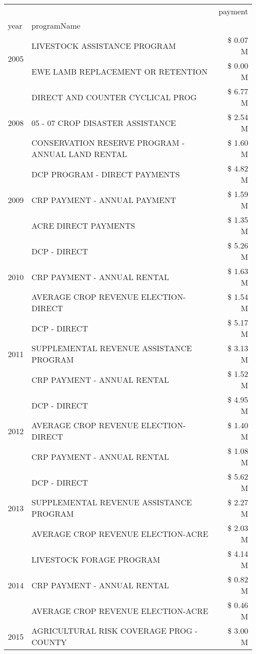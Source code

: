 \begin{tabular}{llr}
\toprule
 &  & payment \\
year & programName &  \\
\midrule
\multirow[t]{2}{*}{2005} & LIVESTOCK ASSISTANCE PROGRAM & \$ 0.07 M \\
 & EWE LAMB REPLACEMENT OR RETENTION & \$ 0.00 M \\
\cline{1-3}
\multirow[t]{3}{*}{2008} & DIRECT AND COUNTER CYCLICAL PROG & \$ 6.77 M \\
 & 05 - 07 CROP DISASTER ASSISTANCE & \$ 2.54 M \\
 & CONSERVATION RESERVE PROGRAM - ANNUAL LAND RENTAL & \$ 1.60 M \\
\cline{1-3}
\multirow[t]{3}{*}{2009} & DCP PROGRAM - DIRECT PAYMENTS & \$ 4.82 M \\
 & CRP PAYMENT - ANNUAL PAYMENT & \$ 1.59 M \\
 & ACRE DIRECT PAYMENTS & \$ 1.35 M \\
\cline{1-3}
\multirow[t]{3}{*}{2010} & DCP - DIRECT & \$ 5.26 M \\
 & CRP PAYMENT - ANNUAL RENTAL & \$ 1.63 M \\
 & AVERAGE CROP REVENUE ELECTION-DIRECT & \$ 1.54 M \\
\cline{1-3}
\multirow[t]{3}{*}{2011} & DCP - DIRECT & \$ 5.17 M \\
 & SUPPLEMENTAL REVENUE ASSISTANCE PROGRAM & \$ 3.13 M \\
 & CRP PAYMENT - ANNUAL RENTAL & \$ 1.52 M \\
\cline{1-3}
\multirow[t]{3}{*}{2012} & DCP - DIRECT & \$ 4.95 M \\
 & AVERAGE CROP REVENUE ELECTION-DIRECT & \$ 1.40 M \\
 & CRP PAYMENT - ANNUAL RENTAL & \$ 1.08 M \\
\cline{1-3}
\multirow[t]{3}{*}{2013} & DCP - DIRECT & \$ 5.62 M \\
 & SUPPLEMENTAL REVENUE ASSISTANCE PROGRAM & \$ 2.27 M \\
 & AVERAGE CROP REVENUE ELECTION-ACRE & \$ 2.03 M \\
\cline{1-3}
\multirow[t]{3}{*}{2014} & LIVESTOCK FORAGE PROGRAM & \$ 4.14 M \\
 & CRP PAYMENT - ANNUAL RENTAL & \$ 0.82 M \\
 & AVERAGE CROP REVENUE ELECTION-ACRE & \$ 0.46 M \\
\cline{1-3}
\multirow[t]{3}{*}{2015} & AGRICULTURAL RISK COVERAGE PROG - COUNTY & \$ 3.00 M \\

\end{tabular}
